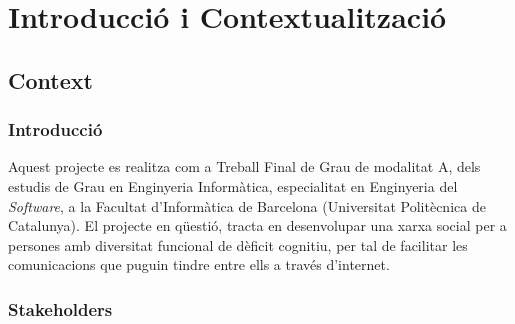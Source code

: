 \documentclass[11pt,catalan,listoffigures,listoftables]{tfgetsinf}
\begin{document}
\chapter{Introducció i Contextualització}

\section{Context}

\subsection{Introducció}

Aquest projecte es realitza com a Treball Final de Grau de modalitat A, dels estudis de Grau en Enginyeria Informàtica, especialitat en Enginyeria del \textit{Software}, a la Facultat d’Informàtica de Barcelona (Universitat Politècnica de Catalunya).
El projecte en qüestió, tracta en desenvolupar una xarxa social per a persones amb diversitat funcional de dèficit cognitiu, per tal de facilitar les comunicacions que puguin tindre entre ells a través d’internet.

\subsection{Stakeholders}
\end{document}
